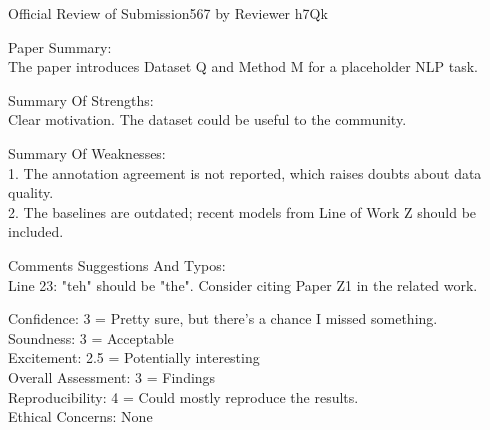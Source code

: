 \documentclass[10pt]{article}
\begin{document}
{\large Official Review of Submission567 by Reviewer h7Qk}

Paper Summary:\\
The paper introduces Dataset Q and Method M for a placeholder NLP task.

Summary Of Strengths:\\
Clear motivation. The dataset could be useful to the community.

Summary Of Weaknesses:\\
1. The annotation agreement is not reported, which raises doubts about data quality.\\
2. The baselines are outdated; recent models from Line of Work Z should be included.

Comments Suggestions And Typos:\\
Line 23: "teh" should be "the". Consider citing Paper Z1 in the related work.

Confidence: 3 = Pretty sure, but there's a chance I missed something.\\
Soundness: 3 = Acceptable\\
Excitement: 2.5 = Potentially interesting\\
Overall Assessment: 3 = Findings\\
Reproducibility: 4 = Could mostly reproduce the results.\\
Ethical Concerns: None
\end{document}
